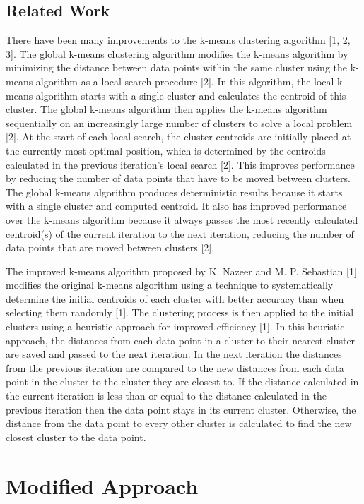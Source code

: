 \documentclass[conference,compsoc]{IEEEtran}
\begin{document}
\subsection{Related Work}

There have been many improvements to the k-means clustering algorithm [1, 2, 3]. The global k-means clustering algorithm modifies the k-means algorithm by minimizing the distance between data points within the same cluster using the k-means algorithm as a local search procedure [2]. In this algorithm, the local k-means algorithm starts with a single cluster and calculates the centroid of this cluster. The global k-means algorithm then applies the k-means algorithm sequentially on an increasingly large number of clusters to solve a local problem [2]. At the start of each local search, the cluster centroids are initially placed at the currently most optimal position, which is determined by the centroids calculated in the previous iteration’s local search [2]. This improves performance by reducing the number of data points that have to be moved between clusters. The global k-means algorithm produces deterministic results because it starts with a single cluster and computed centroid. It also has improved performance over the k-means algorithm because it always passes the most recently calculated centroid(s) of the current iteration to the next iteration, reducing the number of data points that are moved between clusters [2].

The improved k-means algorithm proposed by K. Nazeer and M. P. Sebastian [1] modifies the original k-means algorithm using a technique to systematically determine the initial centroids of each cluster with better accuracy than when selecting them randomly [1]. The clustering process is then applied to the initial clusters using a heuristic approach for improved efficiency [1]. In this heuristic approach, the distances from each data point in a cluster to their nearest cluster are saved and passed to the next iteration. In the next iteration the distances from the previous iteration are compared to the new distances from each data point in the cluster to the cluster they are closest to. If the distance calculated in the current iteration is less than or equal to the distance calculated in the previous iteration then the data point stays in its current cluster. Otherwise, the distance from the data point to every other cluster is calculated to find the new closest cluster to the data point.

\section{Modified Approach}
\end{document}
